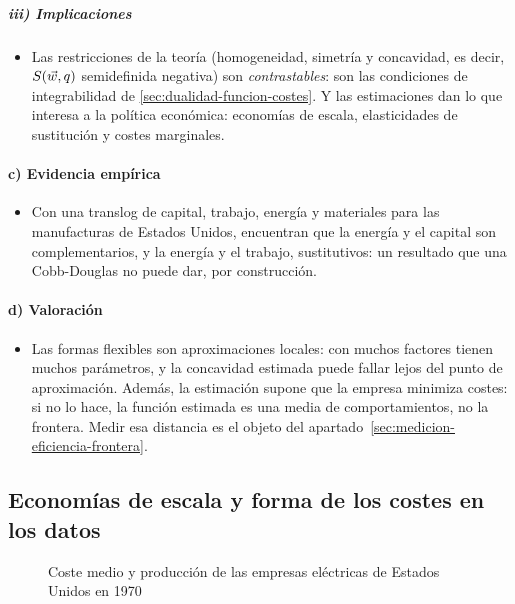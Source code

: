 \documentclass[11pt]{article}
\begin{document}
\subparagraph{iii) Implicaciones}

\begin{itemize}
\item Las restricciones de la teoría (homogeneidad, simetría y concavidad, es decir, $S(\vec{w},q)$ semidefinida negativa) son \emph{contrastables}: son las condiciones de integrabilidad de \ref{sec:dualidad-funcion-costes}. Y las estimaciones dan lo que interesa a la política económica: economías de escala, elasticidades de sustitución y costes marginales.
\end{itemize}

\paragraph{c) Evidencia empírica}

\begin{itemize}
\item Con una translog de capital, trabajo, energía y materiales para las manufacturas de Estados Unidos, \textcite{BerndtWood1975Technology} encuentran que la energía y el capital son complementarios, y la energía y el trabajo, sustitutivos: un resultado que una Cobb-Douglas no puede dar, por construcción.
\end{itemize}

\paragraph{d) Valoración}

\begin{itemize}
\item Las formas flexibles son aproximaciones locales: con muchos factores tienen muchos parámetros, y la concavidad estimada puede fallar lejos del punto de aproximación. Además, la estimación supone que la empresa minimiza costes: si no lo hace, la función estimada es una media de comportamientos, no la frontera. Medir esa distancia es el objeto del apartado~\ref{sec:medicion-eficiencia-frontera}.
\end{itemize}

\subsection{Economías de escala y forma de los costes en los datos}\label{sec:economias-escala-forma}

\begin{figure}[H]
\centering
\caption{Coste medio y producción de las empresas eléctricas de Estados Unidos en 1970}\label{fig:christensen-greene}
\end{figure}
\end{document}
